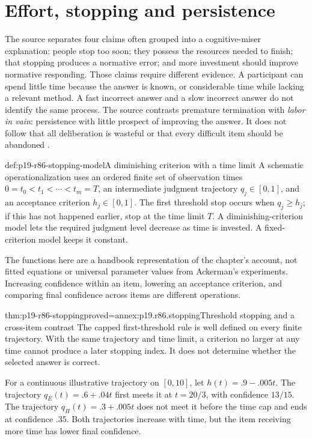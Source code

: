 \section{Effort, stopping and persistence}
\label{sec:p19-r86-persistence}

The source separates four claims often grouped into a cognitive-miser
explanation: people stop too soon; they possess the resources needed to finish;
that stopping produces a normative error; and more investment should improve
normative responding. Those claims require different evidence. A participant
can spend little time because the answer is known, or considerable time while
lacking a relevant method. A fast incorrect answer and a slow incorrect answer
do not identify the same process. The source contrasts premature termination
with \emph{labor in vain}: persistence with little prospect of improving the
answer. It does not follow that all deliberation is wasteful or that every
difficult item should be abandoned
\cite[pp.~520--522]{ThompsonElqayamAckerman2021MetaReasoning}.

\begin{hbdefinition}{def:p19-r86-stopping-model}{A diminishing criterion with a time limit}
A schematic operationalization uses an ordered finite set of observation times
\(0=t_0<t_1<\cdots<t_m=T\), an intermediate judgment trajectory
\(q_j\in[0,1]\), and an acceptance criterion \(h_j\in[0,1]\).
The first threshold stop occurs when \(q_j\geq h_j\); if this has
not happened earlier, stop at the time limit \(T\). A diminishing-criterion
model lets the required judgment level decrease as time is invested. A
fixed-criterion model keeps it constant.

The functions here are a handbook representation of the chapter's account,
not fitted equations or universal parameter values from Ackerman's experiments.
Increasing confidence within an item, lowering an acceptance criterion, and
comparing final confidence across items are different operations.
\end{hbdefinition}

\begin{hbtheorem}{thm:p19-r86-stopping}{proved=annex:p19.r86.stopping}{Threshold stopping and a cross-item contrast}
The capped first-threshold rule is well defined on every finite trajectory.
With the same trajectory and time limit, a criterion no larger at any time
cannot produce a later stopping index. It does not determine whether the
selected answer is correct.

For a continuous illustrative trajectory on \([0,10]\), let
\(h(t)=.9-.005t\). The trajectory \(q_E(t)=.6+.04t\)
first meets it at \(t=20/3\), with confidence \(13/15\).
The trajectory \(q_H(t)=.3+.005t\) does not meet it before the
time cap and ends at confidence .35. Both trajectories increase with time,
but the item receiving more time has lower final confidence.
\end{hbtheorem}

